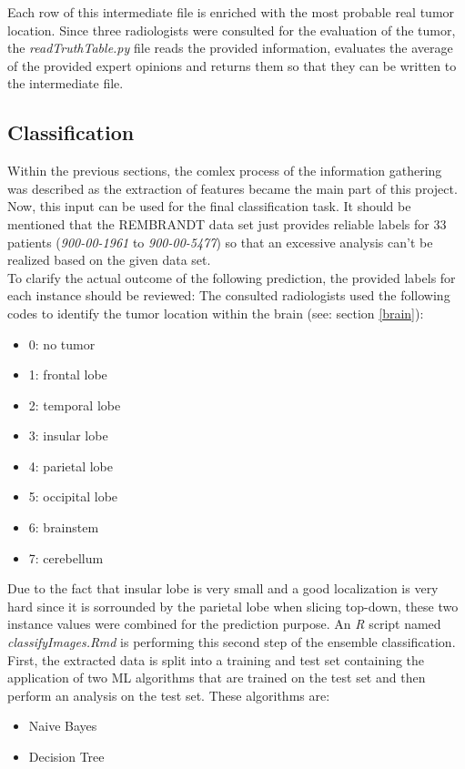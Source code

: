 \documentclass[twoside,11pt]{article}
\begin{document}
	Each row of this intermediate file is enriched with the most probable real tumor location. Since three radiologists were consulted for the evaluation of the tumor, the \textit{readTruthTable.py} file reads the provided information, evaluates the average of the provided expert opinions and returns them so that they can be written to the intermediate file.
	
\subsection{Classification}
	Within the previous sections, the comlex process of the information gathering was described as the extraction of features became the main part of this project. Now, this input can be used  for the final classification task. It should be mentioned that the REMBRANDT data set just provides reliable labels for 33 patients (\textit{900-00-1961} to \textit{900-00-5477}) so that an excessive analysis can't be realized based on the given data set. \\
	To clarify the actual outcome of the following prediction, the provided labels for each instance should be reviewed: The consulted radiologists used the following codes to identify the tumor location within the brain (see: section \ref{brain}):
	\begin{itemize}
		\item 0: no tumor
		\item 1: frontal lobe
		\item 2: temporal lobe
		\item 3: insular lobe
		\item 4: parietal lobe
		\item 5: occipital lobe
		\item 6: brainstem 
		\item 7: cerebellum
	\end{itemize}
	Due to the fact that insular lobe is very small and a good localization is very hard since it is sorrounded by the parietal lobe when slicing top-down, these two instance values were combined for the prediction purpose.
	An \textit{R} script named \textit{classifyImages.Rmd} is performing this second step of the ensemble classification. First, the extracted data is split into a training and test set containing the application of two ML algorithms that are trained on the test set and then perform an analysis on the test set. These algorithms are:
	\begin{itemize}
		\item Naive Bayes
		\item Decision Tree
	\end{itemize}
	
\end{document}
